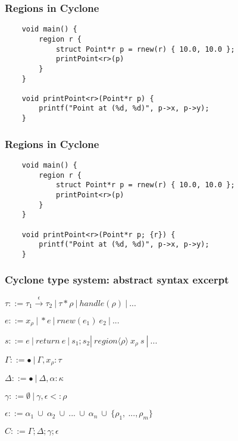 \begin{frame}[fragile]
    \frametitle{Regions in Cyclone}
    \begin{verbatim}
    void main() {
        region r {
            struct Point*r p = rnew(r) { 10.0, 10.0 };
            printPoint<r>(p)
        }
    }

    void printPoint<r>(Point*r p) {
        printf("Point at (%d, %d)", p->x, p->y);
    }
    \end{verbatim}
\end{frame}

\begin{frame}[fragile]
    \frametitle{Regions in Cyclone}
    \begin{verbatim}
    void main() {
        region r {
            struct Point*r p = rnew(r) { 10.0, 10.0 };
            printPoint<r>(p)
        }
    }

    void printPoint<r>(Point*r p; {r}) {
        printf("Point at (%d, %d)", p->x, p->y);
    }
    \end{verbatim}
\end{frame}

\begin{frame}[fragile]
    \frametitle{Cyclone type system: abstract syntax excerpt}

    $\tau ::= \tau_1 \xrightarrow{\epsilon} \tau_2\ |
            \ \tau * \rho\ |\ handle(\rho)\ |\ ... $
    \\ \vspace{10pt}

    $e ::= x_\rho\ |\ *e\ |\ rnew(e_1)\ e_2\ |\ ...$
    \\ \vspace{10pt}

    $s ::=  e\ |\ return\ e\ |\ s_1; s_2 |
            \ region \langle \rho \rangle\ x_\rho\ s\ |\ ...$
    \\ \vspace{10pt}

    $\Gamma ::= \bullet\ |\ \Gamma, x_\rho: \tau$
    \\ \vspace{10pt}

    $\Delta ::= \bullet\ |\ \Delta, \alpha: \kappa$
    \\ \vspace{10pt}

    $\gamma ::= \emptyset\ |\ \gamma, \epsilon <: \rho$
    \\ \vspace{10pt}

    $\epsilon ::= \alpha_1\ \cup\ \alpha_2\ \cup \ ...\ \cup\ \alpha_n \ \cup \
                  \{ \rho_1,\ ..., \rho_m \}$
    \\ \vspace{10pt}

    $C ::= \Gamma; \Delta; \gamma; \epsilon$
\end{frame}

